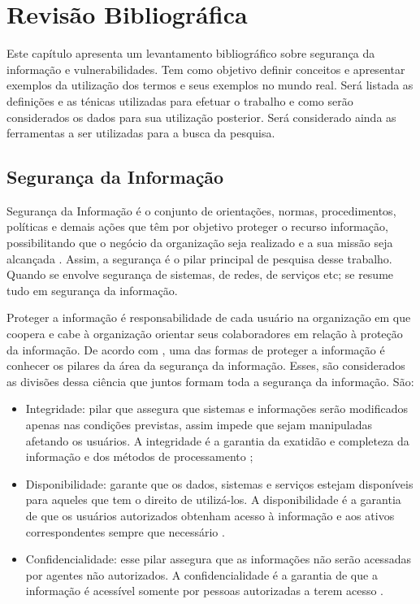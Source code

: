 \chapter[Revisão Bibliográfica]{Revisão Bibliográfica}

Este capítulo apresenta um levantamento bibliográfico sobre segurança da informação e vulnerabilidades. Tem como objetivo definir conceitos e apresentar exemplos da utilização dos termos e seus exemplos no mundo real. Será listada as definições e as ténicas utilizadas para efetuar o trabalho e como serão considerados os dados para sua utilização posterior. Será considerado ainda as ferramentas a ser utilizadas para a busca da pesquisa.

\section{Segurança da Informação}

Segurança da Informação é o conjunto de orientações, normas, procedimentos, políticas e demais ações que têm por objetivo proteger o recurso informação, possibilitando que o negócio da organização seja realizado e a sua missão seja alcançada \cite{Fontes2017}. Assim, a segurança é o pilar principal de pesquisa desse trabalho.  Quando se envolve segurança de sistemas, de redes, de serviços etc; se resume tudo em segurança da informação.  

Proteger a informação é responsabilidade de cada usuário na organização em que coopera e cabe à organização orientar seus colaboradores em relação à proteção da informação. De acordo com , uma das formas de proteger a informação é conhecer os pilares da área da segurança da informação. Esses, são considerados as divisões dessa ciência que juntos formam toda a segurança da informação. São:

\begin{itemize}
\item Integridade: pilar que assegura que sistemas e informações serão modificados apenas nas condições previstas, assim impede que sejam manipuladas afetando os usuários. A integridade é a garantia da exatidão e completeza da informação e dos métodos de processamento \cite{ABNT2005};
\item Disponibilidade: garante que os dados, sistemas e serviços estejam disponíveis para aqueles que tem o direito de utilizá-los. A disponibilidade é a garantia de que os usuários autorizados obtenham acesso à informação e aos ativos correspondentes sempre que necessário \cite{ABNT2005}.
\item Confidencialidade: esse pilar assegura que as informações não serão acessadas por agentes não autorizados. A confidencialidade é a garantia de que a informação é acessível somente por pessoas autorizadas a terem acesso \cite{ABNT2005}.
\end{itemize}

